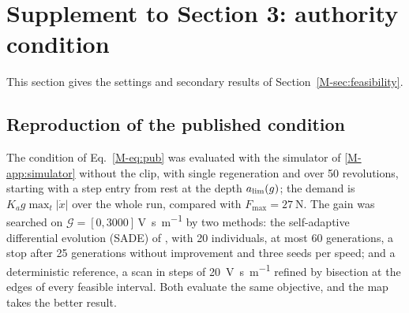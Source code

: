 \section{Supplement to Section 3: authority condition}\label{supp:feas}

This section gives the settings and secondary results of Section~\ref{M-sec:feasibility}.

\subsection{Reproduction of the published condition}\label{supp:feas-pub}

The condition of Eq.~\eqref{M-eq:pub} was evaluated with the simulator of \ref{M-app:simulator} without the clip, with single regeneration and over 50 revolutions, starting with a step entry from rest at the depth $a_{\lim}(g)$; the demand is $K_ag\max_t\lvert\dot x\rvert$ over the whole run, compared with $F_{\max}=\SI{27}{\newton}$. The gain was searched on $\mathcal G=[0,3000]$\,\si{\volt\second\per\metre} by two methods: the self-adaptive differential evolution (SADE) of \citet{qin2009sade}, with 20 individuals, at most 60 generations, a stop after 25 generations without improvement and three seeds per speed; and a deterministic reference, a scan in steps of \SI{20}{\volt\second\per\metre} refined by bisection at the edges of every feasible interval. Both evaluate the same objective, and the map takes the better result.

